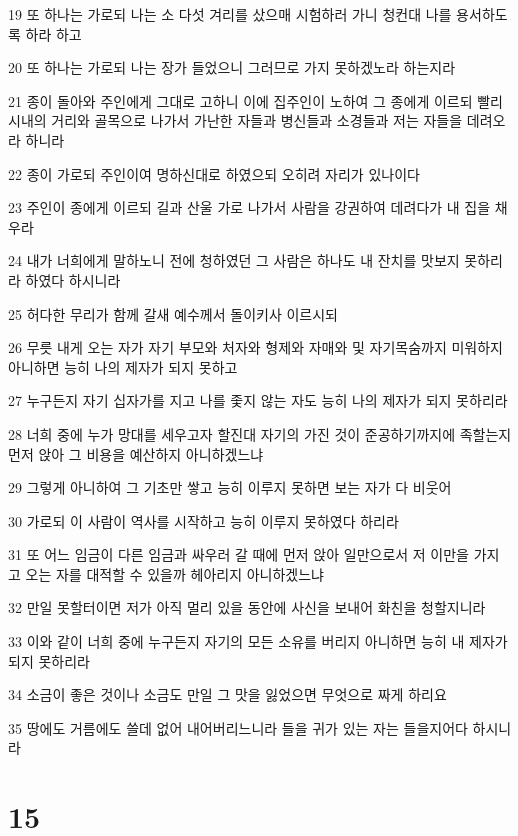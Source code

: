 \par 19 또 하나는 가로되 나는 소 다섯 겨리를 샀으매 시험하러 가니 청컨대 나를 용서하도록 하라 하고
\par 20 또 하나는 가로되 나는 장가 들었으니 그러므로 가지 못하겠노라 하는지라
\par 21 종이 돌아와 주인에게 그대로 고하니 이에 집주인이 노하여 그 종에게 이르되 빨리 시내의 거리와 골목으로 나가서 가난한 자들과 병신들과 소경들과 저는 자들을 데려오라 하니라
\par 22 종이 가로되 주인이여 명하신대로 하였으되 오히려 자리가 있나이다
\par 23 주인이 종에게 이르되 길과 산울 가로 나가서 사람을 강권하여 데려다가 내 집을 채우라
\par 24 내가 너희에게 말하노니 전에 청하였던 그 사람은 하나도 내 잔치를 맛보지 못하리라 하였다 하시니라
\par 25 허다한 무리가 함께 갈새 예수께서 돌이키사 이르시되
\par 26 무릇 내게 오는 자가 자기 부모와 처자와 형제와 자매와 및 자기목숨까지 미워하지 아니하면 능히 나의 제자가 되지 못하고
\par 27 누구든지 자기 십자가를 지고 나를 좇지 않는 자도 능히 나의 제자가 되지 못하리라
\par 28 너희 중에 누가 망대를 세우고자 할진대 자기의 가진 것이 준공하기까지에 족할는지 먼저 앉아 그 비용을 예산하지 아니하겠느냐
\par 29 그렇게 아니하여 그 기초만 쌓고 능히 이루지 못하면 보는 자가 다 비웃어
\par 30 가로되 이 사람이 역사를 시작하고 능히 이루지 못하였다 하리라
\par 31 또 어느 임금이 다른 임금과 싸우러 갈 때에 먼저 앉아 일만으로서 저 이만을 가지고 오는 자를 대적할 수 있을까 헤아리지 아니하겠느냐
\par 32 만일 못할터이면 저가 아직 멀리 있을 동안에 사신을 보내어 화친을 청할지니라
\par 33 이와 같이 너희 중에 누구든지 자기의 모든 소유를 버리지 아니하면 능히 내 제자가 되지 못하리라
\par 34 소금이 좋은 것이나 소금도 만일 그 맛을 잃었으면 무엇으로 짜게 하리요
\par 35 땅에도 거름에도 쓸데 없어 내어버리느니라 들을 귀가 있는 자는 들을지어다 하시니라

\chapter{15}

